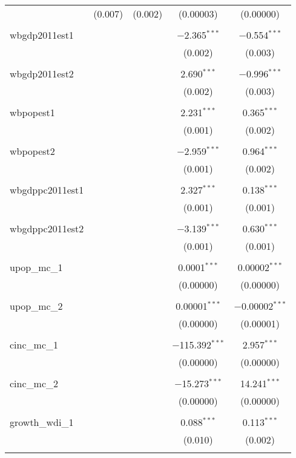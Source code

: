 \begin{table}[!htbp]
\begin{tabular}{@{\extracolsep{5pt}}lcccc}
  & (0.007) & (0.002) & (0.00003) & (0.00000) \\ 
  & & & & \\ 
 wbgdp2011est1 &  &  & $-$2.365$^{***}$ & $-$0.554$^{***}$ \\ 
  &  &  & (0.002) & (0.003) \\ 
  & & & & \\ 
 wbgdp2011est2 &  &  & 2.690$^{***}$ & $-$0.996$^{***}$ \\ 
  &  &  & (0.002) & (0.003) \\ 
  & & & & \\ 
 wbpopest1 &  &  & 2.231$^{***}$ & 0.365$^{***}$ \\ 
  &  &  & (0.001) & (0.002) \\ 
  & & & & \\ 
 wbpopest2 &  &  & $-$2.959$^{***}$ & 0.964$^{***}$ \\ 
  &  &  & (0.001) & (0.002) \\ 
  & & & & \\ 
 wbgdppc2011est1 &  &  & 2.327$^{***}$ & 0.138$^{***}$ \\ 
  &  &  & (0.001) & (0.001) \\ 
  & & & & \\ 
 wbgdppc2011est2 &  &  & $-$3.139$^{***}$ & 0.630$^{***}$ \\ 
  &  &  & (0.001) & (0.001) \\ 
  & & & & \\ 
 upop\_mc\_1 &  &  & 0.0001$^{***}$ & 0.00002$^{***}$ \\ 
  &  &  & (0.00000) & (0.00000) \\ 
  & & & & \\ 
 upop\_mc\_2 &  &  & 0.00001$^{***}$ & $-$0.00002$^{***}$ \\ 
  &  &  & (0.00000) & (0.00001) \\ 
  & & & & \\ 
 cinc\_mc\_1 &  &  & $-$115.392$^{***}$ & 2.957$^{***}$ \\ 
  &  &  & (0.00000) & (0.00000) \\ 
  & & & & \\ 
 cinc\_mc\_2 &  &  & $-$15.273$^{***}$ & 14.241$^{***}$ \\ 
  &  &  & (0.00000) & (0.00000) \\ 
  & & & & \\ 
 growth\_wdi\_1 &  &  & 0.088$^{***}$ & 0.113$^{***}$ \\ 
  &  &  & (0.010) & (0.002) \\ 
  & & & & \\ 

\end{tabular}
\end{table}
